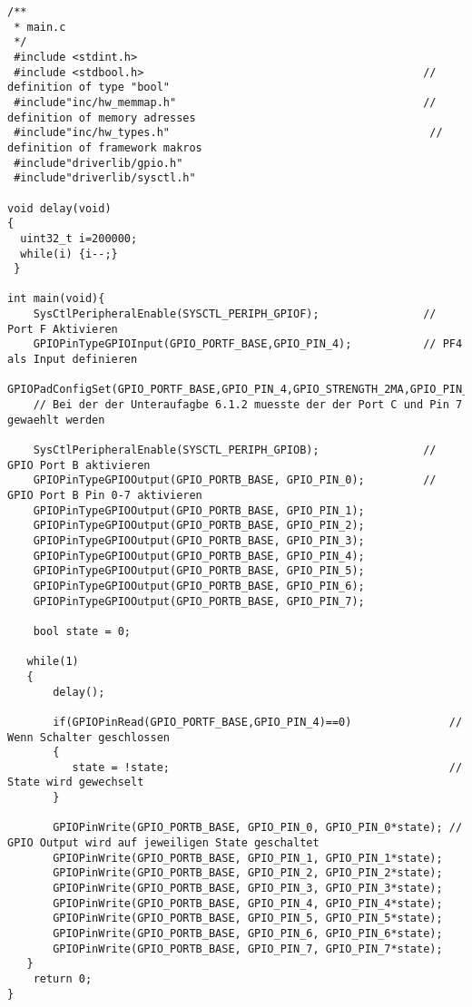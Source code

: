 \begin{lstlisting}
/**
 * main.c
 */
 #include <stdint.h>
 #include <stdbool.h>                                           // definition of type "bool"
 #include"inc/hw_memmap.h"                                      // definition of memory adresses
 #include"inc/hw_types.h"                                        // definition of framework makros
 #include"driverlib/gpio.h"
 #include"driverlib/sysctl.h"

void delay(void)
{
  uint32_t i=200000;
  while(i) {i--;}
 }

int main(void){
    SysCtlPeripheralEnable(SYSCTL_PERIPH_GPIOF);                // Port F Aktivieren
    GPIOPinTypeGPIOInput(GPIO_PORTF_BASE,GPIO_PIN_4);           // PF4 als Input definieren
    GPIOPadConfigSet(GPIO_PORTF_BASE,GPIO_PIN_4,GPIO_STRENGTH_2MA,GPIO_PIN_TYPE_STD_WPU);
    // Bei der der Unteraufagbe 6.1.2 muesste der der Port C und Pin 7 gewaehlt werden

    SysCtlPeripheralEnable(SYSCTL_PERIPH_GPIOB);                // GPIO Port B aktivieren
    GPIOPinTypeGPIOOutput(GPIO_PORTB_BASE, GPIO_PIN_0);         // GPIO Port B Pin 0-7 aktivieren
    GPIOPinTypeGPIOOutput(GPIO_PORTB_BASE, GPIO_PIN_1);
    GPIOPinTypeGPIOOutput(GPIO_PORTB_BASE, GPIO_PIN_2);
    GPIOPinTypeGPIOOutput(GPIO_PORTB_BASE, GPIO_PIN_3);
    GPIOPinTypeGPIOOutput(GPIO_PORTB_BASE, GPIO_PIN_4);
    GPIOPinTypeGPIOOutput(GPIO_PORTB_BASE, GPIO_PIN_5);
    GPIOPinTypeGPIOOutput(GPIO_PORTB_BASE, GPIO_PIN_6);
    GPIOPinTypeGPIOOutput(GPIO_PORTB_BASE, GPIO_PIN_7);

    bool state = 0;

   while(1)
   {
       delay();

       if(GPIOPinRead(GPIO_PORTF_BASE,GPIO_PIN_4)==0)               // Wenn Schalter geschlossen
       {
          state = !state;                                           // State wird gewechselt
       }

       GPIOPinWrite(GPIO_PORTB_BASE, GPIO_PIN_0, GPIO_PIN_0*state); // GPIO Output wird auf jeweiligen State geschaltet
       GPIOPinWrite(GPIO_PORTB_BASE, GPIO_PIN_1, GPIO_PIN_1*state);
       GPIOPinWrite(GPIO_PORTB_BASE, GPIO_PIN_2, GPIO_PIN_2*state);
       GPIOPinWrite(GPIO_PORTB_BASE, GPIO_PIN_3, GPIO_PIN_3*state);
       GPIOPinWrite(GPIO_PORTB_BASE, GPIO_PIN_4, GPIO_PIN_4*state);
       GPIOPinWrite(GPIO_PORTB_BASE, GPIO_PIN_5, GPIO_PIN_5*state);
       GPIOPinWrite(GPIO_PORTB_BASE, GPIO_PIN_6, GPIO_PIN_6*state);
       GPIOPinWrite(GPIO_PORTB_BASE, GPIO_PIN_7, GPIO_PIN_7*state);
   }
    return 0;
}
\end{lstlisting}

